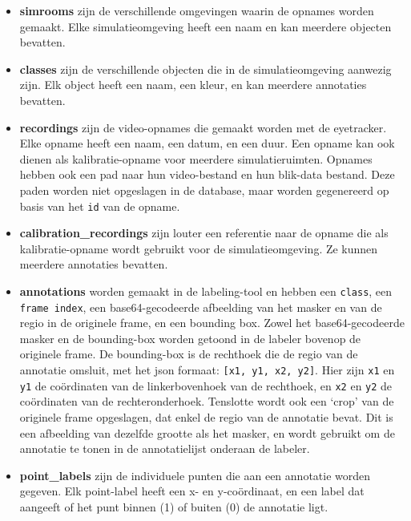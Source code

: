 \begin{itemize}
  \item \textbf{simrooms} zijn de verschillende omgevingen waarin de opnames worden gemaakt. 
  Elke simulatieomgeving heeft een naam en kan meerdere objecten bevatten.
  \item \textbf{classes} zijn de verschillende objecten die in de simulatieomgeving aanwezig zijn. 
  Elk object heeft een naam, een kleur, en kan meerdere annotaties bevatten.
  \item \textbf{recordings} zijn de video-opnames die gemaakt worden met de eyetracker. 
  Elke opname heeft een naam, een datum, en een duur. 
  Een opname kan ook dienen als kalibratie-opname voor meerdere simulatieruimten. 
  Opnames hebben ook een pad naar hun video-bestand en hun blik-data bestand. 
  Deze paden worden niet opgeslagen in de database, maar worden gegenereerd op basis van het \texttt{id} van de opname. 
  \item \textbf{calibration\_recordings} zijn louter een referentie naar de opname die als kalibratie-opname wordt gebruikt 
  voor de simulatieomgeving. Ze kunnen meerdere annotaties bevatten.
  \item \textbf{annotations} worden gemaakt in de labeling-tool en hebben een \texttt{class}, een \texttt{frame index}, 
  een base64-gecodeerde afbeelding van het masker en van de regio in de originele frame, en een bounding box. Zowel het base64-gecodeerde 
  masker en de bounding-box worden getoond in de labeler bovenop de originele frame. De bounding-box is de rechthoek die de regio van de 
  annotatie omsluit, met het json formaat: \texttt{[x1, y1, x2, y2]}. Hier zijn \texttt{x1} en \texttt{y1} de coördinaten van de 
  linkerbovenhoek van de rechthoek, en \texttt{x2} en \texttt{y2} de coördinaten van de rechteronderhoek. 
  Tenslotte wordt ook een `crop' van de originele frame opgeslagen, dat enkel de regio van de annotatie bevat. 
  Dit is een afbeelding van dezelfde grootte als het masker, en wordt gebruikt om de annotatie te tonen in de annotatielijst onderaan de labeler.
  \item \textbf{point\_labels} zijn de individuele punten die aan een annotatie worden gegeven. Elk point-label heeft een x- en y-coördinaat, en een label dat aangeeft of het punt binnen (1) of buiten (0) de annotatie ligt.
\end{itemize}

